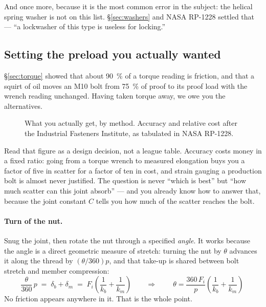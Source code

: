 \documentclass[11pt,a4paper]{article}
\begin{document}
\medskip
And once more, because it is the most common error in the subject: the helical spring washer is not
on this list. \S\ref{sec:washers} and NASA RP-1228 settled that --- ``a lockwasher of this type is
useless for locking.''

\subsection{Setting the preload you actually wanted}

\S\ref{sec:torque} showed that about \SI{90}{\percent} of a torque reading is friction, and that a
squirt of oil moves an M10 bolt from \SI{75}{\percent} of proof to its proof load with the wrench
reading unchanged. Having taken torque away, we owe you the alternatives.

\begin{figure}[H]\centering
\resizebox{0.98\textwidth}{!}{}
\caption{What you actually get, by method. Accuracy and relative cost after the Industrial Fasteners
Institute, as tabulated in NASA RP-1228.}
\label{fig:preacc}
\end{figure}

Read that figure as a design decision, not a league table. Accuracy costs money in a fixed ratio:
going from a torque wrench to measured elongation buys you a factor of five in scatter for a factor
of ten in cost, and strain gauging a production bolt is almost never justified. The question is
never ``which is best'' but ``how much scatter can this joint absorb'' --- and you already know how
to answer that, because the joint constant $C$ tells you how much of the scatter reaches the bolt.

\paragraph{Turn of the nut.} Snug the joint, then rotate the nut through a specified \emph{angle}.
It works because the angle is a direct geometric measure of stretch: turning the nut by $\theta$
advances it along the thread by $(\theta/360)p$, and that take-up is shared between bolt stretch and
member compression:
\[
\frac{\theta}{360}\,p \;=\; \delta_b+\delta_m \;=\; F_i\!\left(\frac{1}{k_b}+\frac{1}{k_m}\right)
\qquad\Longrightarrow\qquad
\boxed{\ \theta = \dfrac{360\,F_i}{p}\left(\dfrac{1}{k_b}+\dfrac{1}{k_m}\right)\ }
\]
No friction appears anywhere in it. That is the whole point.
\end{document}

